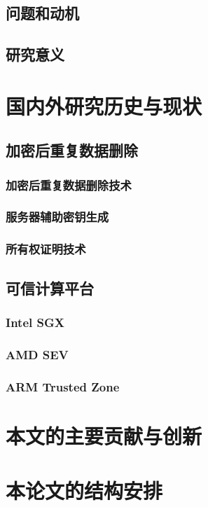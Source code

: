 \subsection{问题和动机}
\subsection{研究意义}

\section{国内外研究历史与现状}

\subsection{加密后重复数据删除}
\subsubsection{加密后重复数据删除技术}
\subsubsection{服务器辅助密钥生成}
\subsubsection{所有权证明技术}
\subsection{可信计算平台}
\subsubsection{Intel SGX}
\subsubsection{AMD SEV}
\subsubsection{ARM Trusted Zone}


\section{本文的主要贡献与创新}

\section{本论文的结构安排}